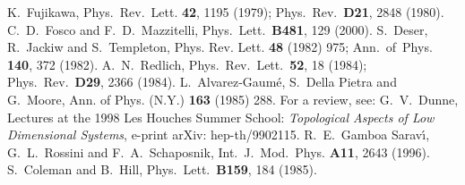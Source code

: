 \documentclass[a4paper,12pt]{article}
\begin{document}
\newpage
\begin{thebibliography}{bib}
K.~Fujikawa, Phys.~Rev.~Lett. {\bf 42}, 1195 (1979);
 Phys.~Rev.~{\bf D21}, 2848 (1980).
C.~D.~Fosco and F.~D.~Mazzitelli, Phys.~Lett.~{\bf B481},
  129 (2000). 
S.~Deser, R.~Jackiw and S.~Templeton, 
Phys. Rev. Lett. {\bf 48} (1982) 975;
Ann.~of~Phys. {\bf 140}, 372 (1982).  
A.~N.~Redlich, Phys.~Rev.~Lett.~{\bf 52}, 18 (1984); Phys.~Rev.~{\bf D29}, 2366 (1984).
 L.~Alvarez-Gaum\'e, S.~Della Pietra and G.~Moore, Ann. of
Phys.  (N.Y.) {\bf 163} (1985) 288.
For a review, see:
  G.~V.~Dunne, Lectures at the 1998 Les Houches Summer School: {\em
    Topological Aspects of Low Dimensional Systems}, e-print arXiv:
  hep-th/9902115.  
R.~E.~Gamboa Sarav\'{\i},
  G.~L.~Rossini and F.~A.~Schaposnik, Int.~J.~Mod.~Phys. {\bf A11},
  2643 (1996).  
S.~Coleman and B.~Hill,
  Phys.~Lett.~{\bf B159}, 184 (1985).
\end{thebibliography}
\end{document}
